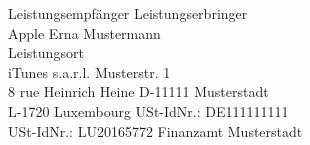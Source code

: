 \documentclass{article}
\begin{document}
\noindent
Leistungsempfänger \hfill Leistungserbringer\\
Apple \hfill Erna Mustermann\\
Leistungsort \\
iTunes s.a.r.l. \hfill Musterstr. 1\\
8 rue Heinrich Heine \hfill D-11111 Musterstadt\\
L-1720 Luxembourg \hfill USt-IdNr.: DE111111111\\
USt-IdNr.: LU20165772 \hfill Finanzamt Musterstadt\\
\vspace{1cm}

\noindent
\end{document}
